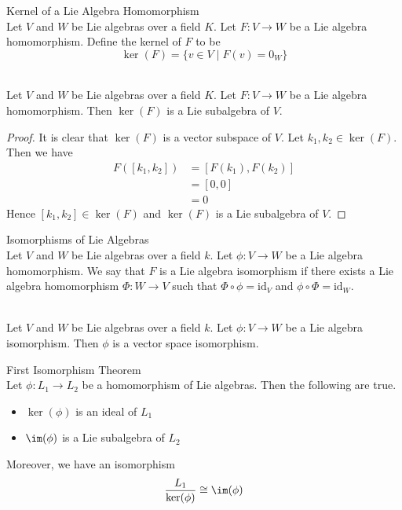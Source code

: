 \documentclass[a4paper]{article}
\begin{document}
\begin{defn}{Kernel of a Lie Algebra Homomorphism}{} \\Let $V$ and $W$ be Lie algebras over a field $K$. Let $F:V\to W$ be a Lie algebra homomorphism. Define the kernel of $F$ to be $$\ker(F)=\{v\in V\;|\;F(v)=0_W\}$$
\end{defn}

\begin{lmm}{}{} \\Let $V$ and $W$ be Lie algebras over a field $K$. Let $F:V\to W$ be a Lie algebra homomorphism. Then $\ker(F)$ is a Lie subalgebra of $V$. 
\begin{proof}
It is clear that $\ker(F)$ is a vector subspace of $V$. Let $k_1,k_2\in\ker(F)$. Then we have 
\begin{align*}
F([k_1,k_2])&=[F(k_1),F(k_2)]\tag{$F$ is a Lie algebra homomorphism}\\
&=[0,0]\\
&=0
\end{align*}
Hence $[k_1,k_2]\in\ker(F)$ and $\ker(F)$ is a Lie subalgebra of $V$. 
\end{proof}
\end{lmm}

\begin{defn}{Isomorphisms of Lie Algebras}{} \\Let $V$ and $W$ be Lie algebras over a field $k$. Let $\phi:V\to W$ be a Lie algebra homomorphism. We say that $F$ is a Lie algebra isomorphism if there exists a Lie algebra homomorphism $\Phi:W\to V$ such that $\Phi\circ\phi=\text{id}_V$ and $\phi\circ\Phi=\text{id}_W$. 
\end{defn}

\begin{prp}{}{} \\Let $V$ and $W$ be Lie algebras over a field $k$. Let $\phi:V\to W$ be a Lie algebra isomorphism. Then $\phi$ is a vector space isomorphism. 
\end{prp}

\begin{thm}{First Isomorphism Theorem}{} \\Let $\phi:L_1\to L_2$ be a homomorphism of Lie algebras. Then the following are true. 
\begin{itemize}
\item $\ker(\phi)$ is an ideal of $L_1$
\item $\im(\phi)$ is a Lie subalgebra of $L_2$
\end{itemize}
Moreover, we have an isomorphism $$\frac{L_1}{\ker(\phi)}\cong\im(\phi)$$
\end{thm}
\end{document}
